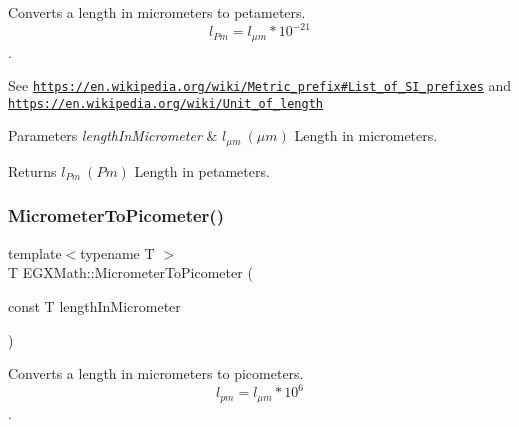 Converts a length in micrometers to petameters. \[ l_{Pm}=l_{\mu m} * 10^{-21} \]. 

See \href{https://en.wikipedia.org/wiki/Metric_prefix#List_of_SI_prefixes}{\tt https\+://en.\+wikipedia.\+org/wiki/\+Metric\+\_\+prefix\#\+List\+\_\+of\+\_\+\+S\+I\+\_\+prefixes} and \href{https://en.wikipedia.org/wiki/Unit_of_length}{\tt https\+://en.\+wikipedia.\+org/wiki/\+Unit\+\_\+of\+\_\+length} 
\begin{DoxyParams}{Parameters}
{\em length\+In\+Micrometer} & $ l_{\mu m}\ (\mu m)$ Length in micrometers. \\
\hline
\end{DoxyParams}
\begin{DoxyReturn}{Returns}
$ l_{Pm}\ (Pm)$ Length in petameters. 
\end{DoxyReturn}
\mbox{\label{group___e_g_x_math-_conversions-_length_conversions-_micrometer-_s_i_ga912ed4989391eeb5d25f43e99108502e}} 
\subsubsection{\texorpdfstring{Micrometer\+To\+Picometer()}{MicrometerToPicometer()}}
{\footnotesize\ttfamily template$<$typename T $>$ \\
T E\+G\+X\+Math\+::\+Micrometer\+To\+Picometer (\begin{DoxyParamCaption}\item[{const T}]{length\+In\+Micrometer }\end{DoxyParamCaption})}



Converts a length in micrometers to picometers. \[ l_{pm}=l_{\mu m} * 10^{6} \]. 

